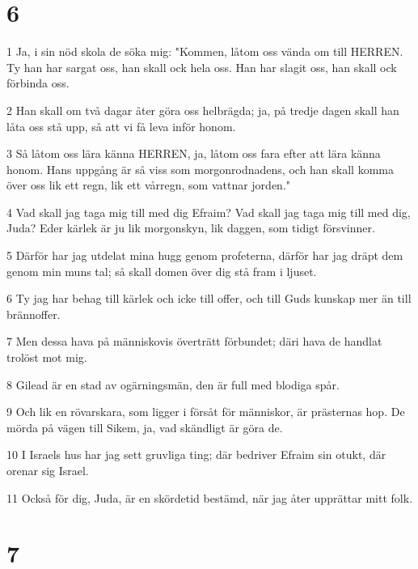 \chapter{6}

\par 1 Ja, i sin nöd skola de söka mig: "Kommen, låtom oss vända om till HERREN. Ty han har sargat oss, han skall ock hela oss. Han har slagit oss, han skall ock förbinda oss.
\par 2 Han skall om två dagar åter göra oss helbrägda; ja, på tredje dagen skall han låta oss stå upp, så att vi få leva inför honom.
\par 3 Så låtom oss lära känna HERREN, ja, låtom oss fara efter att lära känna honom. Hans uppgång är så viss som morgonrodnadens, och han skall komma över oss lik ett regn, lik ett vårregn, som vattnar jorden."
\par 4 Vad skall jag taga mig till med dig Efraim? Vad skall jag taga mig till med dig, Juda? Eder kärlek är ju lik morgonskyn, lik daggen, som tidigt försvinner.
\par 5 Därför har jag utdelat mina hugg genom profeterna, därför har jag dräpt dem genom min muns tal; så skall domen över dig stå fram i ljuset.
\par 6 Ty jag har behag till kärlek och icke till offer, och till Guds kunskap mer än till brännoffer.
\par 7 Men dessa hava på människovis överträtt förbundet; däri hava de handlat trolöst mot mig.
\par 8 Gilead är en stad av ogärningsmän, den är full med blodiga spår.
\par 9 Och lik en rövarskara, som ligger i försåt för människor, är prästernas hop. De mörda på vägen till Sikem, ja, vad skändligt är göra de.
\par 10 I Israels hus har jag sett gruvliga ting; där bedriver Efraim sin otukt, där orenar sig Israel.
\par 11 Också för dig, Juda, är en skördetid bestämd, när jag åter upprättar mitt folk.

\chapter{7}

